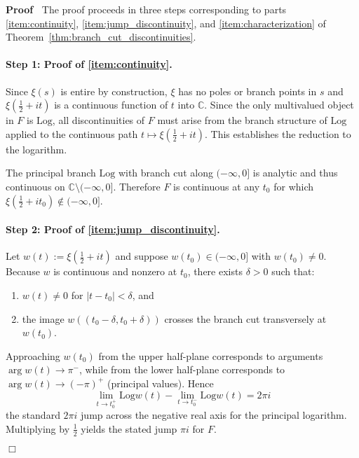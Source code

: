 \documentclass{article}
\newcommand{\assign}{:=}
\newcommand{\nin}{\not\in}
\newenvironment{proof}{\noindent\textbf{Proof\ }}{\hspace*{\fill}$\Box$\medskip}
\begin{document}
\begin{proof}
  The proof proceeds in three steps corresponding to parts
  \eqref{item:continuity}, \eqref{item:jump_discontinuity}, and
  \eqref{item:characterization} of
  Theorem~\ref{thm:branch_cut_discontinuities}.
  
  \paragraph{Step 1: Proof of \eqref{item:continuity}.} Since $\xi (s)$ is
  entire by construction, $\xi$ has no poles or branch points in $s$ and $\xi
  \left( \frac{1}{2} + it \right)$ is a continuous function of $t$ into
  $\mathbb{C}$. Since the only multivalued object in $F$ is $\mathrm{Log}$,
  all discontinuities of $F$ must arise from the branch structure of
  $\mathrm{Log}$ applied to the continuous path $t \mapsto \xi \left(
  \frac{1}{2} + it \right)$. This establishes the reduction to the logarithm.
  
  The principal branch $\mathrm{Log}$ with branch cut along $(- \infty, 0]$ is
  analytic and thus continuous on $\mathbb{C} \setminus (- \infty, 0]$.
  Therefore $F$ is continuous at any $t_0$ for which $\xi \left( \frac{1}{2} +
  it_0 \right) \nin (- \infty, 0]$.
  
  \paragraph{Step 2: Proof of \eqref{item:jump_discontinuity}.} Let $w (t)
  \assign \xi \left( \frac{1}{2} + it \right)$ and suppose $w (t_0) \in (-
  \infty, 0]$ with $w (t_0) \neq 0$. Because $w$ is continuous and nonzero at
  $t_0$, there exists $\delta > 0$ such that:
  \begin{enumerate}
    \item $w (t) \neq 0$ for $|t - t_0 | < \delta$, and
    
    \item the image $w ((t_0 - \delta, t_0 + \delta))$ crosses the branch cut
    transversely at $w (t_0)$.
  \end{enumerate}
  Approaching $w (t_0)$ from the upper half-plane corresponds to arguments
  $\arg w (t) \to \pi^-$, while from the lower half-plane corresponds to $\arg
  w (t) \to (- \pi)^+$ (principal values). Hence
  \begin{equation}
    \lim_{t \to t_0^+} \mathrm{Log} w (t) - \lim_{t \to t_0^-} \mathrm{Log} w
    (t) = 2 \pi i
  \end{equation}
  the standard $2 \pi i$ jump across the negative real axis for the principal
  logarithm. Multiplying by $\frac{1}{2}$ yields the stated jump $\pi i$ for
  $F$.
  

\end{proof}
\end{document}
